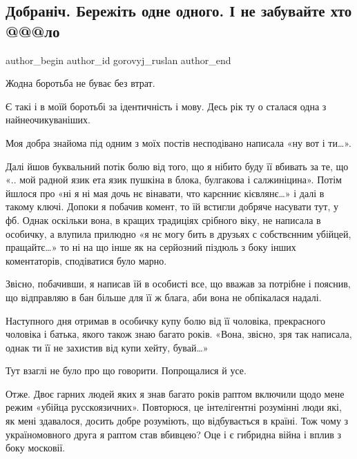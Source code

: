  
 
 
 
 
 
\subsection{Добраніч. Бережіть одне одного. І не забувайте хто @@@ло}
\label{sec:20_09_2021.fb.gorovyj_ruslan.1.dobranich_mova_hujlo}
 
\ifcmt
 author_begin
   author_id gorovyj_ruslan
 author_end
\fi

Жодна боротьба не буває без втрат.

Є такі і в моїй боротьбі за ідентичність і мову. Десь рік ту о сталася одна з
найнеочикуваніших. 

Моя добра знайома під одним з моїх постів несподівано написала «ну вот і ти…».

Далі йшов буквальний потік болю від того, що я нібито буду її вбивать за те, що
«.. мой радной язик ета язик пушкіна в блока, булгакова і салжиніцина». Потім
йшлося про «ні я ні мая дочь нє вінавати, что карєнниє кієвлянє…» і далі в
такому ключі. Допоки я побачив комент, то їй встигли добряче насувати тут, у
фб. Однак оскільки вона, в кращих традиціях срібного віку, не написала в
особичку, а влупила прилюдно «я нє могу бить в друзьях с собствєнним убійцей,
пращайтє…» то ні на що інше як на серйозний піздюль з боку інших коментаторів,
сподіватися було марно.

Звісно, побачивши, я написав їй в особисті все, що вважав за потрібне і
пояснив, що відправляю в бан більше для її ж блага, аби вона не обпікалася
надалі.

Наступного дня отримав в особичку купу болю від її чоловіка, прекрасного
чоловіка і батька, якого також знаю багато років. «Вона, звісно, зря так
написала, однак ти її не захистив від купи хейту, бувай…»

Тут взаглі не було про що говорити. Попрощалися й усе.

Отже. Двоє гарних людей яких я знав багато років раптом включили щодо мене
режим «убійца русскоязичних». Повторюся, це інтелігентні розумінні люди які, як
мені здавалося, досить добре розуміють, що відбувається в країні. Тож чому з
україномовного друга я раптом став вбивцею? Оце і є гибридна війна і вплив з
боку московії. 

